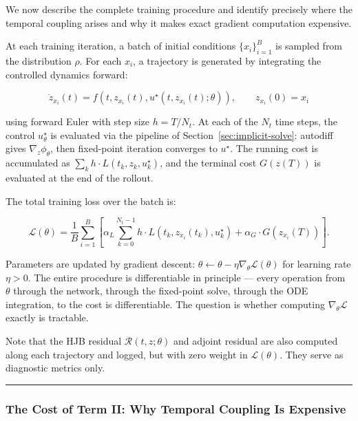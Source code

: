 \documentclass{article}
\begin{document}
We now describe the complete training procedure and identify precisely where
the temporal coupling arises and why it makes exact gradient computation
expensive.

At each training iteration, a batch of initial conditions
$\{x_i\}_{i=1}^{B}$ is sampled from the distribution $\rho$. For each
$x_i$, a trajectory is generated by integrating the controlled dynamics
forward:

\begin{equation}
    \dot{z}_{x_i}(t) = f(t, z_{x_i}(t), u^\star(t, z_{x_i}(t);\theta)),
    \qquad z_{x_i}(0) = x_i
    \label{eq:controlled_dynamics}
\end{equation}

using forward Euler with step size $h = T/N_t$. At each of the $N_t$ time
steps, the control $u^\star_\theta$ is evaluated via the pipeline of
Section~\ref{sec:implicit-solve}: autodiff gives $\nabla_z\phi_\theta$, then
fixed-point iteration converges to $u^\star$. The running cost is accumulated
as $\sum_k h \cdot L(t_k, z_k, u^\star_k)$, and the terminal cost
$G(z(T))$ is evaluated at the end of the rollout.

The total training loss over the batch is:

\begin{equation}
    \mathcal{L}(\theta)
    = \frac{1}{B} \sum_{i=1}^{B}
    \left[\alpha_L \sum_{k=0}^{N_t-1} h \cdot L(t_k, z_{x_i}(t_k), u^\star_k)
    + \alpha_G \cdot G(z_{x_i}(T))\right].
    \label{eq:training_loss}
\end{equation}

Parameters are updated by gradient descent: $\theta \leftarrow \theta - \eta
\nabla_\theta \mathcal{L}(\theta)$ for learning rate $\eta > 0$. The entire
procedure is differentiable in principle --- every operation from $\theta$
through the network, through the fixed-point solve, through the ODE
integration, to the cost is differentiable. The question is whether computing
$\nabla_\theta\mathcal{L}$ exactly is tractable.

Note that the HJB residual $\mathcal{R}(t,z;\theta)$ and adjoint residual are
also computed along each trajectory and logged, but with zero weight in
$\mathcal{L}(\theta)$. They serve as diagnostic metrics only.

\medskip\hrule\medskip

\subsubsection{The Cost of Term II: Why Temporal Coupling Is Expensive}
\end{document}
